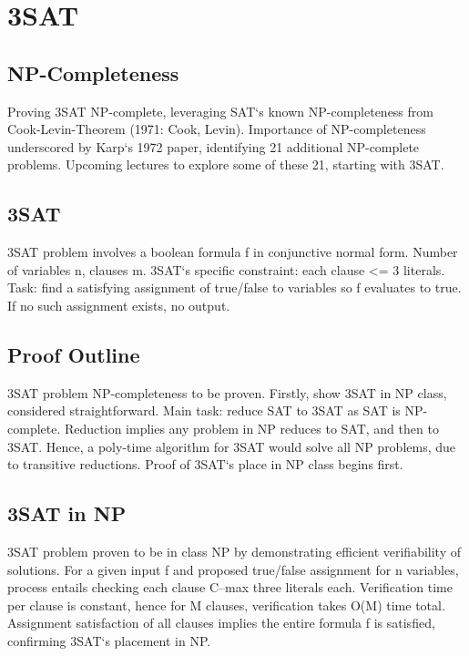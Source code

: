 \section*{3SAT}

\subsection*{NP-Completeness}
Proving 3SAT NP-complete, leveraging SAT`s known NP-completeness from Cook-Levin-Theorem (1971: Cook, Levin).
Importance of NP-completeness underscored by Karp`s 1972 paper, identifying 21 additional NP-complete problems.
Upcoming lectures to explore some of these 21, starting with 3SAT\@.

\subsection*{3SAT}
3SAT problem involves a boolean formula f in conjunctive normal form.
Number of variables n, clauses m.
3SAT`s specific constraint: each clause \textless{}= 3 literals.
Task: find a satisfying assignment of true/false to variables so f evaluates to true.
If no such assignment exists, no output.

\subsection*{Proof Outline}
3SAT problem NP-completeness to be proven.
Firstly, show 3SAT in NP class, considered straightforward.
Main task: reduce SAT to 3SAT as SAT is NP-complete.
Reduction implies any problem in NP reduces to SAT, and then to 3SAT\@.
Hence, a poly-time algorithm for 3SAT would solve all NP problems, due to transitive reductions.
Proof of 3SAT`s place in NP class begins first.

\subsection*{3SAT in NP}
3SAT problem proven to be in class NP by demonstrating efficient verifiability of solutions.
For a given input f and proposed true/false assignment for n variables, process entails checking each clause C--max three literals each.
Verification time per clause is constant, hence for M clauses, verification takes O(M) time total.
Assignment satisfaction of all clauses implies the entire formula f is satisfied, confirming 3SAT`s placement in NP\@.

